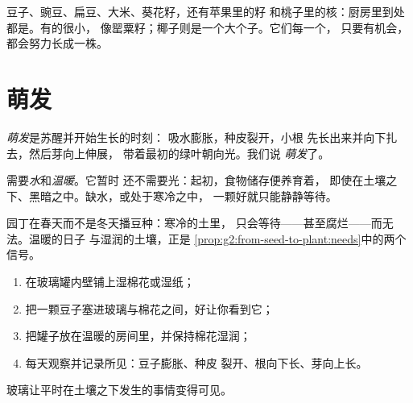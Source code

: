 \begin{remark}[种子也在我们的厨房里]\label{rem:g2:from-seed-to-plant:kitchen}
豆子、豌豆、扁豆、大米、葵花籽，还有苹果里的籽
和桃子里的核：厨房里到处都是。有的很小，
像罂粟籽；椰子则是一个大个子。它们每一个，
只要有机会，都会努力长成一株。
\end{remark}

\section{萌发}

\begin{definition}[萌发]\label{def:g2:from-seed-to-plant:germination}
\emph{萌发}是苏醒并开始生长的时刻：
吸水膨胀，种皮裂开，小根
先长出来并向下扎去，然后芽向上伸展，
带着最初的绿叶朝向光。我们说
\emph{萌发}了。
\end{definition}

\begin{proposition}[种子萌发需要什么]\label{prop:g2:from-seed-to-plant:needs}
需要\emph{水}和\emph{温暖}。它暂时
还不需要光：起初，食物储存便养育着，
即使在土壤之下、黑暗之中。缺水，或处于寒冷之中，
一颗好就只能静静等待。
\end{proposition}
\admitted

\begin{example}[为什么要等到春天才播种]\label{ex:g2:from-seed-to-plant:spring}
园丁在春天而不是冬天播豆种：寒冷的土里，
只会等待——甚至腐烂——而无法。温暖的日子
与湿润的土壤，正是
\cref{prop:g2:from-seed-to-plant:needs}中的两个信号。
\end{example}

\begin{method}[播种并观察种子萌发]\label{met:g2:from-seed-to-plant:sow}
\begin{enumerate}
  \item 在玻璃罐内壁铺上湿棉花或湿纸；
  \item 把一颗豆子塞进玻璃与棉花之间，好让你看到它；
  \item 把罐子放在温暖的房间里，并保持棉花湿润；
  \item 每天观察并记录所见：豆子膨胀、种皮
        裂开、根向下长、芽向上长。
\end{enumerate}
玻璃让平时在土壤之下发生的事情变得可见。
\end{method}

